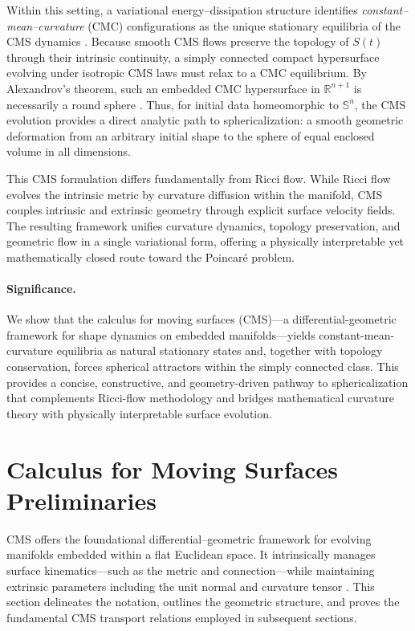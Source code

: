 \documentclass[11pt]{article}
\theoremstyle{definition}
\theoremstyle{plain}
\theoremstyle{remark}
\begin{document}
Within this setting, a variational energy–dissipation structure identifies \emph{constant–mean–curvature} (CMC) configurations as the unique stationary equilibria of the CMS dynamics \cite{Svintradze2017, Svintradze2018, Svintradze2019, Svintradze2020, Svintradze2023, Svintradze2024a, Svintradze2024b, Svintradze2025}.  
Because smooth CMS flows preserve the topology of $S(t)$ through their intrinsic continuity, a simply connected compact hypersurface evolving under isotropic CMS laws must relax to a CMC equilibrium.  
By Alexandrov’s theorem, such an embedded CMC hypersurface in $\mathbb{R}^{n+1}$ is necessarily a round sphere \cite{Alexandrov1962}.  
Thus, for initial data homeomorphic to $\mathbb{S}^n$, the CMS evolution provides a direct analytic path to sphericalization: a smooth geometric deformation from an arbitrary initial shape to the sphere of equal enclosed volume in all dimensions.

This CMS formulation differs fundamentally from Ricci flow.  
While Ricci flow evolves the intrinsic metric by curvature diffusion within the manifold, CMS couples intrinsic and extrinsic geometry through explicit surface velocity fields.  
The resulting framework unifies curvature dynamics, topology preservation, and geometric flow in a single variational form, offering a physically interpretable yet mathematically closed route toward the Poincaré problem.

\paragraph{Significance.}
We show that the calculus for moving surfaces (CMS)—a differential-geometric framework for shape dynamics on embedded manifolds—yields constant-mean-curvature equilibria as natural stationary states and, together with topology conservation, forces spherical attractors within the simply connected class. This provides a concise, constructive, and geometry-driven pathway to sphericalization that complements Ricci-flow methodology and bridges mathematical curvature theory with physically interpretable surface evolution.



\section{Calculus for Moving Surfaces Preliminaries}

CMS offers the foundational differential–geometric framework for evolving manifolds embedded within a flat Euclidean space. It intrinsically manages surface kinematics—such as the metric and connection—while maintaining extrinsic parameters including the unit normal and curvature tensor \cite{Grinfeld2013}. This section delineates the notation, outlines the geometric structure, and proves the fundamental CMS transport relations employed in subsequent sections.
\end{document}
